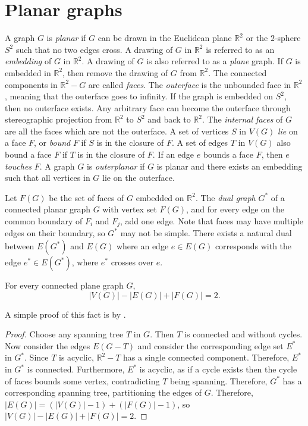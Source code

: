 \section{Planar graphs}\label{sec:Planar graphs}
A graph \(G\) is \textit{planar} if \(G\) can be drawn in the Euclidean plane \( \mathbb{R}^2 \) or the $2$-sphere $S^2$ such that no two edges cross.  A drawing of $G$ in $\mathbb{R}^2$ is referred to as an \textit{embedding} of $G$ in $\mathbb{R}^2$. A drawing of $G$ is also referred to as a \textit{plane} graph. If \(G\) is embedded in \(\mathbb{R}^2 \), then remove the drawing of $G$ from $\mathbb{R}^2$. The connected components in $\mathbb{R}^2 - G$ are called \textit{faces}. The \textit{outerface} is the unbounded face in $\mathbb{R}^2$, meaning that the outerface goes to infinity. If the graph is embedded on $S^2$, then no outerface exists. Any arbitrary face can become the outerface through stereographic projection from $\mathbb{R}^2$ to $S^2$ and back to $\mathbb{R}^2$. The \textit{internal faces} of $G$ are all the faces which are not the outerface. A set of vertices $S$ in $V(G)$ \textit{lie} on a face $F$, or \textit{bound} $F$ if $S$ is in the closure of $F$. A set of edges $T$ in $V(G)$ also bound a face $F$ if $T$ is in the closure of $F$. If an edge $e$ bounds a face $F$, then $e$ \textit{touches} $F$. A graph \(G\) is \textit{outerplanar} if \(G\) is planar and there exists an embedding such that all vertices in \(G\) lie on the outerface.

Let \(F(G)\) be the set of faces of \(G\) embedded on \(\mathbb{R}^2\). 
The \textit{dual graph} $G^*$ of a connected planar graph $G$ with vertex set $F(G)$, and for every edge on the common boundary of $F_i$ and $F_j$, add one edge. Note that faces may have multiple edges on their boundary, so $G^*$ may not be simple. There exists a natural dual between $E(G^*)$ and $E(G)$ where an edge $e \in E(G)$ corresponds with the edge $e^* \in E(G^*)$, where $e^*$ crosses over $e$. 

\begin{theorem}\label{thm:Euler_planar}
	For every connected plane graph $G$, 
	\begin{equation}
		|V(G)| - |E(G)| + |F(G)| = 2.
	\end{equation}
\end{theorem}

A simple proof of this fact is by \textcite{staudtGeometrieLage1847}.

\begin{proof}
	Choose any spanning tree $T$ in $G$. Then $T$ is connected and without cycles. Now consider the edges $E(G - T)$ and consider the corresponding edge set $E^*$ in $G^*$. Since $T$ is acyclic, $\mathbb{R}^2 - T$ has a single connected component. Therefore, $E^*$ in $G^*$ is connected. Furthermore, $E^*$ is acyclic, as if a cycle exists then the cycle of faces bounds some vertex, contradicting $T$ being spanning. Therefore, $G^*$ has a corresponding spanning tree, partitioning the edges of $G$. Therefore, $|E(G)| = (|V(G)| - 1) + (|F(G)| - 1)$, so $|V(G)| - |E(G)| + |F(G)| = 2$. 
\end{proof}


